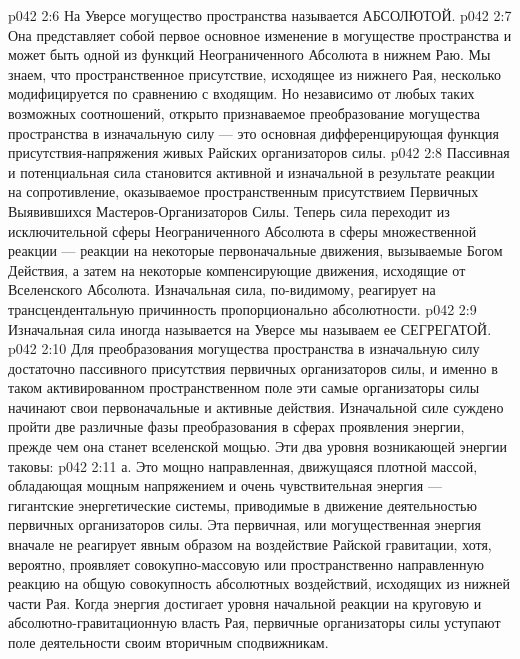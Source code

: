 \vs p042 2:6 На Уверсе могущество пространства называется АБСОЛЮТОЙ.
\vs p042 2:7 \pc {}\bibnobreakspace {} Она представляет собой первое основное изменение в могуществе пространства и может быть одной из функций Неограниченного Абсолюта в нижнем Раю. Мы знаем, что пространственное присутствие, исходящее из нижнего Рая, несколько модифицируется по сравнению с входящим. Но независимо от любых таких возможных соотношений, открыто признаваемое преобразование могущества пространства в изначальную силу --- это основная дифференцирующая функция присутствия\hyp{}напряжения живых Райских организаторов силы.
\vs p042 2:8 Пассивная и потенциальная сила становится активной и изначальной в результате реакции на сопротивление, оказываемое пространственным присутствием Первичных Выявившихся Мастеров\hyp{}Организаторов Силы. Теперь сила переходит из исключительной сферы Неограниченного Абсолюта в сферы множественной реакции --- реакции на некоторые первоначальные движения, вызываемые Богом Действия, а затем на некоторые компенсирующие движения, исходящие от Вселенского Абсолюта. Изначальная сила, по\hyp{}видимому, реагирует на трансцендентальную причинность пропорционально абсолютности.
\vs p042 2:9 Изначальная сила иногда называется  на Уверсе мы называем ее СЕГРЕГАТОЙ.
\vs p042 2:10 \pc {}\bibnobreakspace {} Для преобразования могущества пространства в изначальную силу достаточно пассивного присутствия первичных организаторов силы, и именно в таком активированном пространственном поле эти самые организаторы силы начинают свои первоначальные и активные действия. Изначальной силе суждено пройти две различные фазы преобразования в сферах проявления энергии, прежде чем она станет вселенской мощью. Эти два уровня возникающей энергии таковы:
\vs p042 2:11 \pc а.  Это мощно направленная, движущаяся плотной массой, обладающая мощным напряжением и очень чувствительная энергия --- гигантские энергетические системы, приводимые в движение деятельностью первичных организаторов силы. Эта первичная, или могущественная энергия вначале не реагирует явным образом на воздействие Райской гравитации, хотя, вероятно, проявляет совокупно\hyp{}массовую или пространственно направленную реакцию на общую совокупность абсолютных воздействий, исходящих из нижней части Рая. Когда энергия достигает уровня начальной реакции на круговую и абсолютно\hyp{}гравитационную власть Рая, первичные организаторы силы уступают поле деятельности своим вторичным сподвижникам.
